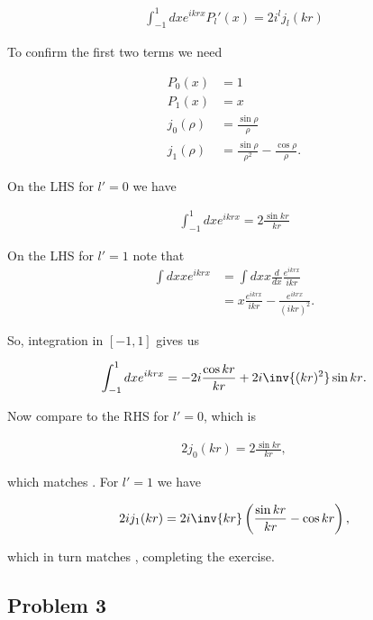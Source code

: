 \begin{align}\label{eqn:desaiCh4:202}
\int_{-1}^1 dx e^{i k r x} P_l'(x) = 2 i^l j_l(kr) 
\end{align}

To confirm the first two terms we need

\begin{align}\label{eqn:desaiCh4:203}
P_0(x) &= 1 \\
P_1(x) &= x \\
j_0(\rho) &= \frac{\sin\rho}{\rho} \\
j_1(\rho) &= \frac{\sin\rho}{\rho^2} - \frac{\cos\rho}{\rho}.
\end{align}

On the LHS for $l'=0$ we have

\begin{align}\label{eqn:desaiCh4:204}
\int_{-1}^1 dx e^{i k r x} = 2 \frac{\sin{kr}}{kr}
\end{align}

On the LHS for $l'=1$ note that
\begin{align*}
\int dx x e^{i k r x} 
&= 
\int dx x \frac{d}{dx} \frac{e^{i k r x}}{ikr} \\
&= 
x \frac{e^{i k r x}}{ikr} 
- \frac{e^{i k r x}}{(ikr)^2}.
\end{align*}

So, integration in $[-1,1]$ gives us

\begin{align}\label{eqn:desaiCh4:205}
\int_{-1}^1 dx e^{i k r x} =  -2i \frac{\cos{kr}}{kr} + 2i \inv{(kr)^2} \sin{kr}.
\end{align}

Now compare to the RHS for $l'=0$, which is

\begin{align}\label{eqn:desaiCh4:206}
2 j_0(kr) = 2 \frac{\sin{kr}}{kr},
\end{align}

which matches .  For $l'=1$ we have

\begin{align}\label{eqn:desaiCh4:207}
2 i j_1(kr) = 2i \inv{kr} \left( \frac{\sin{kr}}{kr} - \cos{kr} \right),
\end{align}

which in turn matches , completing the exercise.

\subsection{Problem 3}
